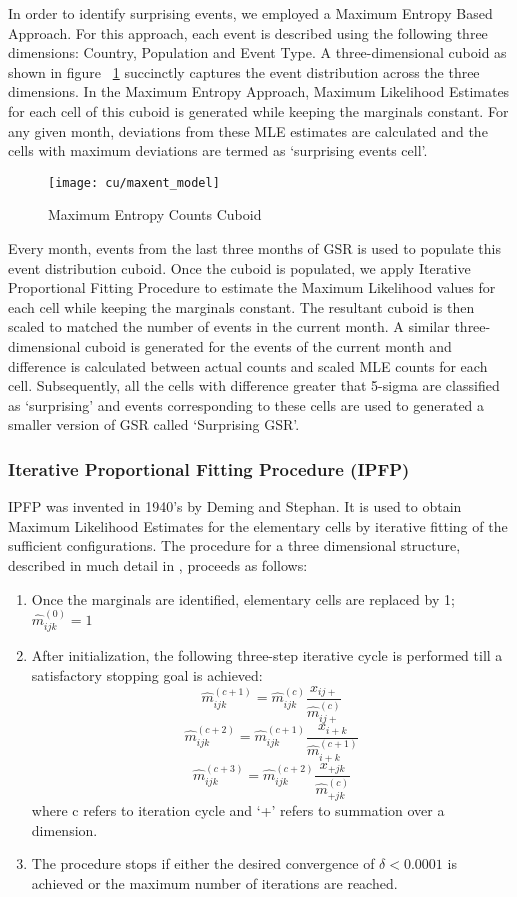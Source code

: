 In order to identify surprising events, we employed a Maximum Entropy Based Approach. For this approach, each event is described using the following three dimensions: Country, Population and Event Type. A three-dimensional cuboid as shown in figure ~\ref{fig:maxent_model} succinctly captures the event distribution across the three dimensions. In the Maximum Entropy Approach, Maximum Likelihood Estimates for each cell of this cuboid is generated while keeping the marginals constant. For any given month, deviations from these MLE estimates are calculated and the cells with maximum deviations are termed as `surprising events cell'.

\begin{figure}[H]
\centering
\texttt{[image: cu/maxent\_model]}
\caption{Maximum Entropy Counts Cuboid}
\label{fig:maxent_model}
\end{figure}

Every month, events from the last three months of GSR is used to populate this event distribution cuboid. Once the cuboid is populated, we apply Iterative Proportional Fitting Procedure\cite{ipfp} to estimate the Maximum Likelihood values for each cell while keeping the marginals constant. The resultant cuboid is then scaled to matched the number of events in the current month. A similar three-dimensional cuboid is generated for the events of the current month and difference is calculated between actual counts and scaled MLE counts for each cell. Subsequently, all the cells with difference greater that 5-sigma are classified as `surprising' and events corresponding to these cells are used to generated a smaller version of GSR called `Surprising GSR'. 

\subsubsection{Iterative Proportional Fitting Procedure (IPFP)}
IPFP was invented in 1940's by Deming and Stephan\cite{deming1940least}. It is used to obtain Maximum Likelihood Estimates for the elementary cells by iterative fitting of the sufficient configurations. The procedure for a three dimensional structure, described in much detail in \cite{bishop2007discrete}, proceeds as follows:
\begin{enumerate}
\item Once the marginals are identified, elementary cells are replaced by 1; $\widehat{m}^{(0)}_{ijk}=1$
\item After initialization, the following three-step iterative cycle is performed till a satisfactory stopping goal is achieved:
$$\widehat{m}^{(c+1)}_{ijk} = \widehat{m}^{(c)}_{ijk}\frac{x_{ij+}}{\widehat{m}^{(c)}_{ij+}}$$
$$\widehat{m}^{(c+2)}_{ijk} = \widehat{m}^{(c+1)}_{ijk}\frac{x_{i+k}}{\widehat{m}^{(c+1)}_{i+k}}$$
$$\widehat{m}^{(c+3)}_{ijk} = \widehat{m}^{(c+2)}_{ijk}\frac{x_{+jk}}{\widehat{m}^{(c)}_{+jk}}$$
where c refers to iteration cycle and `+' refers to summation over a dimension. 
\item The procedure stops if either the desired convergence of $\delta < 0.0001$ is achieved or the maximum number of iterations are reached.
\end{enumerate}


